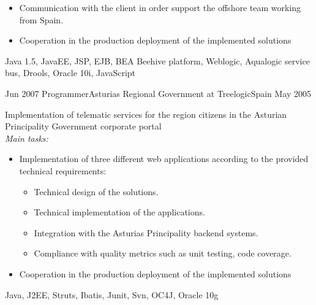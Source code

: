 \begin{experiences}
{\begin{itemize}
                        \item Communication with the client in order support the offshore team working from Spain.

                        \item Cooperation in the production deployment of the implemented solutions
                        
                        
                      \end{itemize}
                    }                    
                    {Java 1.5, JavaEE, JSP, EJB, BEA Beehive platform, Weblogic, Aqualogic service bus, Drools, Oracle 10i, JavaScript}
                    
                    
                    
  \emptySeparator 
  
  
          
  \experience
  {Jun 2007}  {Programmer}{Asturias Regional Government at Treelogic}{Spain}
  {May 2005}   {
                      Implementation of  telematic services for the region citizens in the Asturian Principality Government corporate portal 
\\
\emph{Main tasks:}                      
                      \begin{itemize}

                        \item Implementation of three different web applications according to the provided technical requirements:
                         \begin{itemize}
                         	\item Technical design of the solutions.
                         	\item Technical implementation of the applications.
                        	\item Integration with the Asturias Principality backend systems.
                        	\item Compliance with quality metrics such as unit testing, code coverage.
                        \end{itemize}
                        
                        \item Cooperation in the production deployment of the implemented solutions

                      \end{itemize}
                  }
                  {Java, J2EE, Struts, Ibatis, Junit, Svn, OC4J, Oracle 10g} 
                   
\end{experiences}
